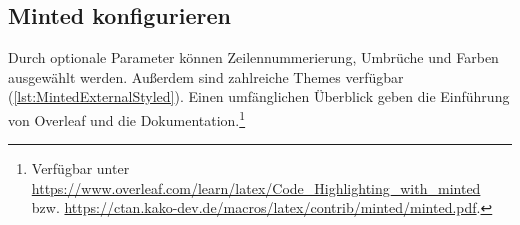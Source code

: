 \subsection{Minted konfigurieren}

Durch optionale Parameter können Zeilennummerierung, Umbrüche und Farben ausgewählt werden. 
Außerdem sind zahlreiche Themes verfügbar (\cref{lst:MintedExternalStyled}).
Einen umfänglichen Überblick geben die Einführung von Overleaf und die Dokumentation.\footnote{Verfügbar unter \url{https://www.overleaf.com/learn/latex/Code_Highlighting_with_minted} bzw. \url{https://ctan.kako-dev.de/macros/latex/contrib/minted/minted.pdf}.}

